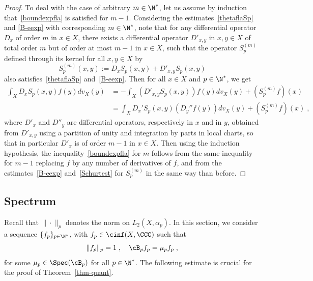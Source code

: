 \begin{proof}
To deal with the case of arbitrary $m\in\N^*$, let us assume by induction that~\eqref{boundexpfla} is satisfied for $m-1$. Considering the estimates~\eqref{thetaflaSp} and \eqref{B-eexp} with corresponding $m\in\N^*$, note that for any differential operator $D_x$ of order $m$ in $x\in X$, there exists a differential operator $D'_{x,y}$ in $x,y\in X$ of total order $m$ but of order at most $m-1$ in $x\in X$, such that the operator $S_p^{(m)}$ defined through its kernel for all $x,y\in X$ by
\begin{equation}
S_p^{(m)}(x,y):=D_xS_p(x,y)+D'_{x,y}S_p(x,y)
\end{equation}
also satisfies~\eqref{thetaflaSp} and~\eqref{B-eexp}. Then for all $x\in X$ and $p\in\N^*$, we get
\begin{equation}
\begin{split}
\int_X D_xS_p(x,y)f(y)dv_X(y)&= -\int_X\left(D'_{x,y}S_p(x,y)\right)f(y)dv_X(y)+(S_p^{(m)}f)(x)\\
&=\int_XD_x'S_p(x,y)\left(D_y''f(y)\right)dv_X(y)+(S_p^{(m)}f)(x)\;,
\end{split}
\end{equation}
where $D'_x$ and $D''_y$ are differential operators, respectively in $x$ and in $y$, obtained from $D'_{x,y}$ using a partition of unity and integration by parts in local charts, so that in particular $D'_x$ is of order $m-1$ in $x\in X$. Then using the induction hypothesis, the inequality~\eqref{boundexpfla} for $m$ follows from the same inequality for $m-1$ replacing $f$ by any number of derivatives of $f$, and from the estimates~\eqref{B-eexp} and~\eqref{Schurtest} for $S_p^{(m)}$ in the same way than before.
\end{proof}

\subsection{Spectrum}\label{specsec}

Recall that $\|\cdot\|_p$ denotes the norm on $L_2(X,\alpha_p)$. In this section, we consider a sequence $\{f_p\}_{p\in\N^*}$, with $f_p\in\cinf(X,\CCC)$ such that
\begin{equation}\label{efBp}
\|f_p\|_p=1\;,\quad \cB_pf_p=\mu_p f_p\;,
\end{equation}
for some $\mu_p\in\Spec(\cB_p)$ for all $p\in\N^*$. The following estimate is crucial for the proof of Theorem~\ref{thm-quant}.

